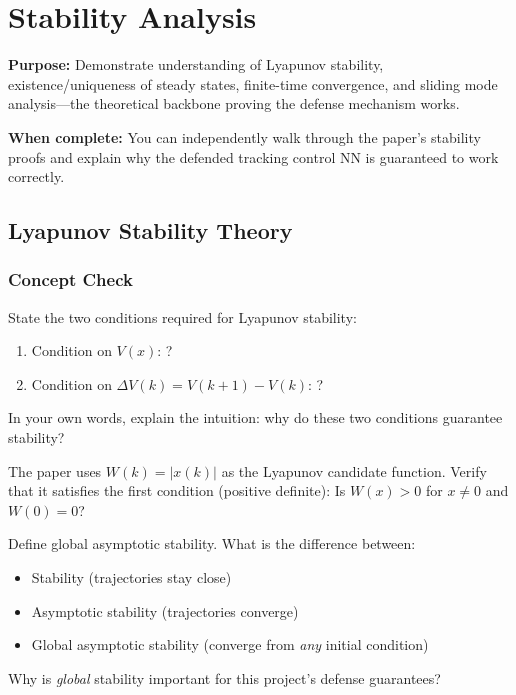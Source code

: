\section{Stability Analysis}

\begin{purposebox}
\textbf{Purpose:} Demonstrate understanding of Lyapunov stability, existence/uniqueness of steady states, finite-time convergence, and sliding mode analysis---the theoretical backbone proving the defense mechanism works.

\textbf{When complete:} You can independently walk through the paper's stability proofs and explain why the defended tracking control NN is guaranteed to work correctly.
\end{purposebox}

\subsection{Lyapunov Stability Theory}

\subsubsection*{Concept Check}

State the two conditions required for Lyapunov stability:
\begin{enumerate}[nosep]
  \item Condition on $V(x)$: ?
  \item Condition on $\Delta V(k) = V(k+1) - V(k)$: ?
\end{enumerate}
In your own words, explain the intuition: why do these two conditions guarantee stability?

\begin{answerbox}\end{answerbox}

The paper uses $W(k) = |x(k)|$ as the Lyapunov candidate function. Verify that it satisfies the first condition (positive definite): Is $W(x) > 0$ for $x \neq 0$ and $W(0) = 0$?

\begin{answerbox}\end{answerbox}

Define global asymptotic stability. What is the difference between:
\begin{itemize}[nosep]
  \item Stability (trajectories stay close)
  \item Asymptotic stability (trajectories converge)
  \item Global asymptotic stability (converge from \emph{any} initial condition)
\end{itemize}
Why is \emph{global} stability important for this project's defense guarantees?


